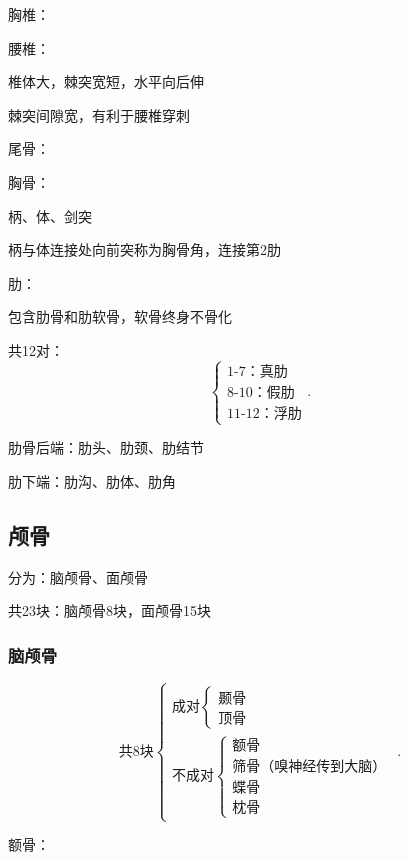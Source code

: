 \begin{notation}
    胸椎：
\end{notation}

\begin{notation}
    腰椎：

    椎体大，棘突宽短，水平向后伸

    棘突间隙宽，有利于腰椎穿刺
\end{notation}

\begin{notation}
    尾骨：
\end{notation}

\begin{notation}
    胸骨：

    柄、体、剑突

    柄与体连接处向前突称为胸骨角，连接第2肋
\end{notation}

\begin{notation}
    肋：

    包含肋骨和肋软骨，软骨终身不骨化

    共12对：
    \[
        \begin{cases}
            \mbox{1-7：真肋}\\ 
            \mbox{8-10：假肋}\\ 
            \mbox{11-12：浮肋}
        \end{cases}
    .\] 

    肋骨后端：肋头、肋颈、肋结节

    肋下端：肋沟、肋体、肋角
\end{notation}

\subsection{颅骨}%
\label{sub:颅骨}
分为：脑颅骨、面颅骨

共23块：脑颅骨8块，面颅骨15块

\subsubsection{脑颅骨}%
\label{subsub:脑颅骨}
\[
    \mbox{共8块}
    \begin{cases}
        \mbox{成对}
        \begin{cases}
            \mbox{颞骨}\\ 
            \mbox{顶骨}
        \end{cases}\\
        \mbox{不成对}
        \begin{cases}
            \mbox{额骨}\\ 
            \mbox{筛骨（嗅神经传到大脑）}\\ 
            \mbox{蝶骨}\\ 
            \mbox{枕骨}
        \end{cases}
    \end{cases}
.\] 
\begin{notation}
    额骨：
\end{notation}

